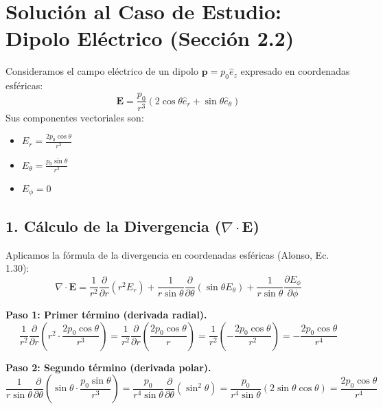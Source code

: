 \documentclass[a4paper]{article}
\begin{document}
\section*{Solución al Caso de Estudio: Dipolo Eléctrico (Sección 2.2)}

Consideramos el campo eléctrico de un dipolo $\mathbf{p} = p_0 \hat{e}_z$ expresado en coordenadas esféricas:
\begin{equation}
    \mathbf{E} = \frac{p_0}{r^3} (2 \cos \theta \hat{e}_r + \sin \theta \hat{e}_\theta)
\end{equation}
Sus componentes vectoriales son:
\begin{itemize}
    \item $E_r = \frac{2 p_0 \cos \theta}{r^3}$
    \item $E_\theta = \frac{p_0 \sin \theta}{r^3}$
    \item $E_\phi = 0$
\end{itemize}

\subsection*{1. Cálculo de la Divergencia ($\nabla \cdot \mathbf{E}$)}
Aplicamos la fórmula de la divergencia en coordenadas esféricas (Alonso, Ec. 1.30):
\begin{equation}
    \nabla \cdot \mathbf{E} = \frac{1}{r^2} \frac{\partial}{\partial r}(r^2 E_r) + \frac{1}{r \sin\theta} \frac{\partial}{\partial \theta}(\sin\theta E_\theta) + \frac{1}{r \sin\theta} \frac{\partial E_\phi}{\partial \phi}
\end{equation}

\textbf{Paso 1: Primer término (derivada radial).}
\begin{equation}
    \frac{1}{r^2} \frac{\partial}{\partial r}\left(r^2 \cdot \frac{2 p_0 \cos \theta}{r^3}\right) = \frac{1}{r^2} \frac{\partial}{\partial r}\left(\frac{2 p_0 \cos \theta}{r}\right) = \frac{1}{r^2} \left( -\frac{2 p_0 \cos \theta}{r^2} \right) = -\frac{2 p_0 \cos \theta}{r^4}
\end{equation}

\textbf{Paso 2: Segundo término (derivada polar).}
\begin{equation}
    \frac{1}{r \sin\theta} \frac{\partial}{\partial \theta}\left(\sin\theta \cdot \frac{p_0 \sin \theta}{r^3}\right) = \frac{p_0}{r^4 \sin\theta} \frac{\partial}{\partial \theta}(\sin^2 \theta) = \frac{p_0}{r^4 \sin\theta} (2 \sin \theta \cos \theta) = \frac{2 p_0 \cos \theta}{r^4}
\end{equation}
\end{document}
